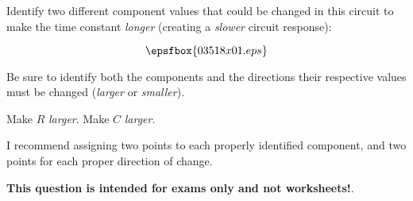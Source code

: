 

Identify two different component values that could be changed in this circuit to make the time constant {\it longer} (creating a {\it slower} circuit response):

$$\epsfbox{03518x01.eps}$$

Be sure to identify both the components and the directions their respective values must be changed ({\it larger} or {\it smaller}).







Make $R$ {\it larger}. \hskip 30pt Make $C$ {\it larger}.

\vskip 10pt

I recommend assigning two points to each properly identified component, and two points for each proper direction of change.







{\bf This question is intended for exams only and not worksheets!}.



